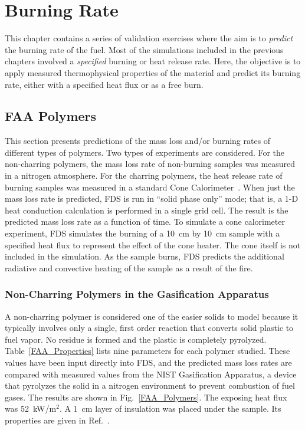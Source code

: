 
\chapter{Burning Rate}

This chapter contains a series of validation exercises where the aim is to {\em predict} the burning rate of the fuel. Most of the simulations included in the previous chapters involved
a {\em specified} burning or heat release rate. Here, the objective is to apply measured thermophysical properties of the material and predict its burning rate, either with a
specified heat flux or as a free burn. 


\section{FAA Polymers}

This section presents predictions of the mass loss and/or burning rates of different types of polymers. Two types of experiments are considered. For the non-charring polymers, the
mass loss rate of non-burning samples was measured in a nitrogen atmosphere. For the charring polymers, the heat release rate of burning samples was measured in a standard
Cone Calorimeter~\cite{conecal}. When just the mass loss rate is predicted, FDS is run in ``solid phase only'' mode; that is, a 1-D heat conduction calculation is performed in a 
single grid cell. The result is the predicted mass loss rate as a function of time. To simulate a cone calorimeter experiment, FDS simulates the burning of a 10~cm by 10~cm sample with
a specified heat flux to represent the effect of the cone heater. The cone itself is not included in the simulation. As the sample burns, FDS predicts the additional radiative and
convective heating of the sample as a result of the fire. 

\newpage

\subsection{Non-Charring Polymers in the Gasification Apparatus}

A non-charring polymer is considered one of the easier solids to model because it typically involves only a single, first order reaction that converts solid plastic to fuel vapor.
No residue is formed and the plastic is completely pyrolyzed. Table~\ref{FAA_Properties}
lists nine parameters for each polymer studied. These values have been input directly into FDS, and the predicted mass loss rates are compared with measured values from the NIST
Gasification Apparatus, a device that pyrolyzes the solid in a nitrogen environment to prevent combustion of fuel gases. The results are shown in Fig.~\ref{FAA_Polymers}. The exposing
heat flux was 52~kW/m$^2$. A 1~cm layer of insulation was placed under the sample. Its properties are given in Ref.~\cite{Stoliarov:CF2009}.


